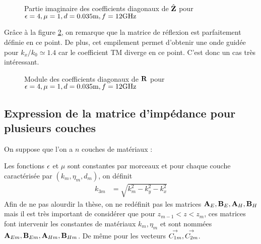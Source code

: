         \begin{figure}[!hbt]
            \centering
            
            \caption[Reproduction résultat P. Soudais p.~11]{Partie imaginaire des coefficients diagonaux de \(\hat\mZ\) pour \(\eps = 4, \mu = 1, d=0.035\text{m}, f=12\text{GHz}\)}
            \label{fig:imp_fourier:plan:soudais}
        \end{figure}


        Grâce à la figure \ref{fig:reflex_fourier:plan:soudais}, on remarque que la matrice de réflexion est parfaitement définie en ce point. De plus, cet empilement permet d'obtenir une onde guidée pour \(k_x\slash k_0 \simeq 1.4\) car le coefficient TM diverge en ce point. C'est donc un cas très intéressant.

        \begin{figure}[!hbt]
            \centering
            
            \caption[Reproduction résultat P. Soudais p.~11]{Module des coefficients diagonaux de \(\mR\) pour \(\eps = 4, \mu = 1, d=0.035\text{m}, f=12\text{GHz}\)}
            \label{fig:reflex_fourier:plan:soudais}
        \end{figure}

    \FloatBarrier
    \subsection{Expression de la matrice d'impédance pour plusieurs couches}
        On suppose que l'on a \(n\) couches de matériaux :
        \begin{figure}[h!btp]
            \centering
            \begin{tikzpicture}
                
            \end{tikzpicture}
        \end{figure}

        Les fonctions \(\eps\) et \(\mu\) sont constantes par morceaux et pour chaque couche caractérisée par \((k_m,\eta_m,d_m)\), on définit
        \begin{align}
          k_{3m} &= \sqrt{k_m^2 - k_y^2 - k_x^2}
        \end{align}
        Afin de ne pas alourdir la thèse, on ne redéfinit pas les matrices \(\mA_E,\mB_E,\mA_H,\mB_H\) mais il est très important de considérer que pour \(z_{m-1}<z<z_m\), ces matrices font intervenir les constantes de matériaux \(k_m,\eta_m\) et sont nommées \(\mA_{Em},\mB_{Em},\mA_{Hm},\mB_{Hm}\). De même pour les vecteurs \(\vect{C_{1m}},\vect{C_{2m}}\).

